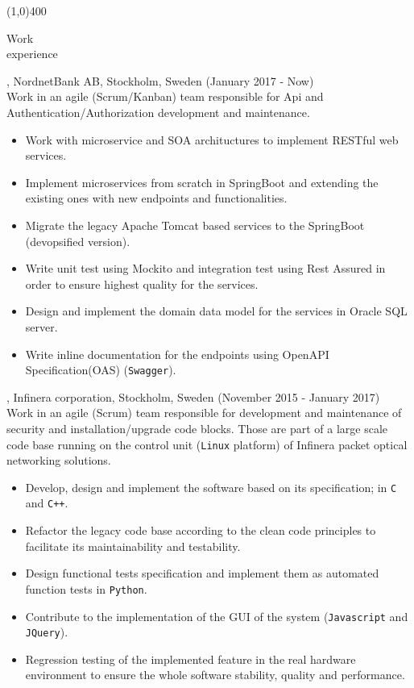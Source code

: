 \documentclass{resume}
\begin{document}
\begin{center}
\line(1,0){400}
\end{center}

\begin{category}{Work \\experience}

, NordnetBank AB, Stockholm, Sweden (January 2017 - Now)\\
Work in an agile (Scrum/Kanban) team responsible for Api and Authentication/Authorization
development and maintenance.
\begin{itemize}
 \item Work with microservice and SOA archituctures to implement RESTful web services. 
 \item Implement microservices from scratch in SpringBoot and extending the existing ones with new endpoints and functionalities.
 \item Migrate the legacy Apache Tomcat based services to the SpringBoot (devopsified version).  
 \item Write unit test using Mockito and integration test using Rest Assured in order to ensure highest quality for the services.  
 \item Design and implement the domain data model for the services in Oracle SQL server.
 \item Write inline documentation for the endpoints using OpenAPI Specification(OAS) (\texttt{Swagger}).  
\end{itemize}  
  
, Infinera corporation, Stockholm, Sweden (November 2015 - January 2017)\\
Work in an agile (Scrum) team responsible for development and maintenance of security
and installation/upgrade code blocks. Those are part of a large scale code base running on 
the control unit (\texttt{Linux} platform) of Infinera packet optical networking solutions.
\begin{itemize}
 \item Develop, design and implement the software based on its specification; in \texttt{C} and \texttt{C++}.
 \item Refactor the legacy code base according to the clean code principles to facilitate its maintainability and testability.
 \item Design functional tests specification and implement them as automated function tests in \texttt{Python}.
 \item Contribute to the implementation of the GUI of the system (\texttt{Javascript} and \texttt{JQuery}).
 \item Regression testing of the implemented feature in the real hardware environment to
   ensure the whole software stability, quality and performance. 
\end{itemize}


\end{category}
\end{document}
